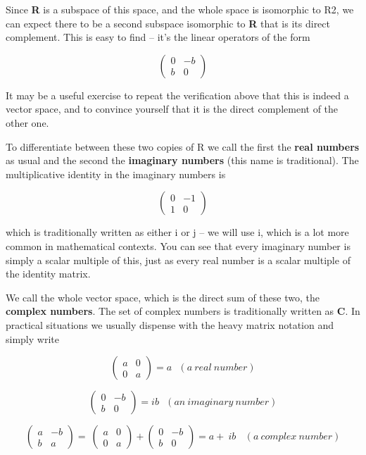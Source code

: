 \documentclass[oneside,english]{amsbook}
\numberwithin{section}{chapter}
\theoremstyle{plain}
\theoremstyle{definition}
\begin{document}
Since \textbf{R} is a subspace of this space, and the whole space is
isomorphic to R2, we can expect there to be a second subspace isomorphic
to \textbf{R} that is its direct complement. This is easy to find --
it's the linear operators of the form

\[\begin{pmatrix}
	0 & - b \\
	b & 0
\end{pmatrix}\]

It may be a useful exercise to repeat the verification above that this
is indeed a vector space, and to convince yourself that it is the direct
complement of the other one.

To differentiate between these two copies of R we call the first the
\textbf{real numbers} as usual and the second the \textbf{imaginary
	numbers} (this name is traditional). The multiplicative identity in the
imaginary numbers is

\[\begin{pmatrix}
	0 & - 1 \\
	1 & 0
\end{pmatrix}\]

which is traditionally written as either i or j -- we will use i, which
is a lot more common in mathematical contexts. You can see that every
imaginary number is simply a scalar multiple of this, just as every real
number is a scalar multiple of the identity matrix.

We call the whole vector space, which is the direct sum of these two,
the \textbf{complex numbers}. The set of complex numbers is
traditionally written as \textbf{C}. In practical situations we usually
dispense with the heavy matrix notation and simply write

\[\begin{pmatrix}
	a & 0 \\
	0 & a
\end{pmatrix} = a\ \ \ (a\ real\ number)\]

\[\begin{pmatrix}
	0 & - b \\
	b & 0
\end{pmatrix} = ib\ \ \ (an\ imaginary\ number)\]

\[\begin{pmatrix}
	a & - b \\
	b & a
\end{pmatrix} = \ \begin{pmatrix}
	a & 0 \\
	0 & a
\end{pmatrix} + \begin{pmatrix}
	0 & - b \\
	b & 0
\end{pmatrix} = a + \ ib\ \ \ \ (a\ complex\ number)\]
\end{document}
